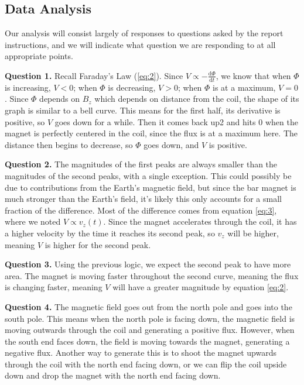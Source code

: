 \documentclass[11pt, letterpaper]{report}
\begin{document}
\subsection{Data Analysis}
Our analysis will consist largely of responses to questions asked by the report instructions, and we will indicate what question we are responding to at all appropriate points.

\textbf{Question 1.} Recall Faraday's Law (\ref{eq:2}). Since $V\propto -\frac{\mathrm{d}\Phi }{\mathrm{d}t} $, we know that when $\Phi $ is increasing, $V<0$; when $\Phi $ is decreasing, $V>0$; when $\Phi $ is at a maximum, $V=0$. Since $\Phi $ depends on $B_z$ which depends on distance from the coil, the shape of its graph is similar to a bell curve. This means for the first half, its derivative is positive, so $V$ goes down for a while. Then it comes back up2 and hits $0$ when the magnet is perfectly centered in the coil, since the flux is at a maximum here. The distance then begins to decrease, so $\Phi $ goes down, and $V$ is positive.

\textbf{Question 2.} The magnitudes of the first peaks are always smaller than the magnitudes of the second peaks, with a single exception. This could possibly be due to contributions from the Earth's magnetic field, but since the bar magnet is much stronger than the Earth's field, it's likely this only accounts for a small fraction of the difference. Most of the difference comes from equation \ref{eq:3}, where we noted $V\propto v_z(t)$. Since the magnet accelerates through the coil, it has a higher velocity by the time it reaches its second peak, so $v_z$ will be higher, meaning $V$ is higher for the second peak.

\textbf{Question 3.} Using the previous logic, we expect the second peak to have more area. The magnet is moving faster throughout the second curve, meaning the flux is changing faster, meaning $V$ will have a greater magnitude by equation \ref{eq:2}.

\textbf{Question 4.} The magnetic field goes out from the north pole and goes into the south pole. This means when the north pole is facing down, the magnetic field is moving outwards through the coil and generating a positive flux. However, when the south end faces down, the field is moving towards the magnet, generating a negative flux. Another way to generate this is to shoot the magnet upwards through the coil with the north end facing down, or we can flip the coil upside down and drop the magnet with the north end facing down.
\end{document}
